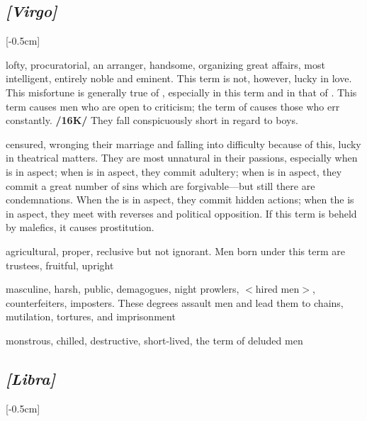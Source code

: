 \subsection{\textit{[Virgo]}}
\marginnote{\Virgo}[-0.5cm]
\vspace{-1mm}
\begin{description}[labelindent=0em , labelwidth=1em, labelsep=1em, leftmargin =!]
\item[\Mercury]
	[0-6] lofty, procuratorial, an arranger, handsome, organizing great affairs, most intelligent, entirely noble and eminent. This term is not, however, lucky in love. This
misfortune is generally true of \Virgo, especially in this term and in that of \Venus. This term causes men who are open to criticism; the term of \Venus\xspace causes those who err constantly. \textbf{/16K/} They fall conspicuously short in regard to boys.
\item[	\Venus]
	[7-16] censured, wronging their marriage and falling into difficulty because of this, lucky in theatrical matters. They are most unnatural in their passions, especially when \Saturn\xspace is in aspect; when \Mercury\xspace is in aspect, they commit adultery; when \Jupiter\xspace is in aspect, they commit a great number of sins which are forgivable—but still there are condemnations. When the \Sun\xspace is in aspect, they commit hidden actions; when the \Moon\xspace is in aspect, they meet with reverses and political opposition. If this term is beheld by malefics, it causes prostitution.
\item[\Jupiter]
	[17-20] agricultural, proper, reclusive but not ignorant. Men born under this term are trustees, fruitful, upright
\item[\Mars]
	[21-27] masculine, harsh, public,
demagogues, night prowlers, $<$hired men$>$, counterfeiters, imposters. These degrees assault men and lead them to chains, mutilation, tortures, and imprisonment	
\item[\Saturn]
	[28-29] monstrous, chilled, destructive, short-lived, the term of deluded men
\end{description}

\subsection{\textit{[Libra]}}
\marginnote{\Libra}[-0.5cm]
\vspace{-1mm}

